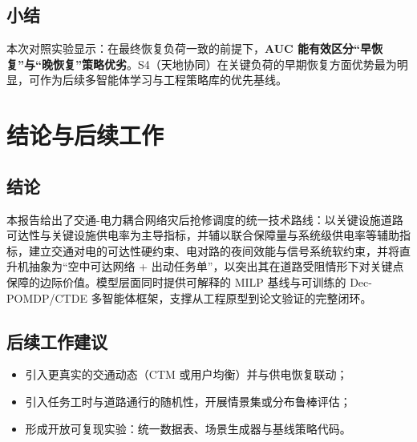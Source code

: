 \documentclass[UTF8,zihao=-4,a4paper,fontset=fandol]{ctexrep}
\begin{document}
\section{小结}
本次对照实验显示：在最终恢复负荷一致的前提下，\textbf{AUC 能有效区分“早恢复”与“晚恢复”策略优劣}。S4（天地协同）在关键负荷的早期恢复方面优势最为明显，可作为后续多智能体学习与工程策略库的优先基线。

\chapter{结论与后续工作}\label{ch:conclusion}
\section{结论}
本报告给出了交通-电力耦合网络灾后抢修调度的统一技术路线：以关键设施道路可达性与关键设施供电率为主导指标，并辅以联合保障量与系统级供电率等辅助指标，建立交通对电的可达性硬约束、电对路的夜间效能与信号系统软约束，并将直升机抽象为“空中可达网络 + 出动任务单”，以突出其在道路受阻情形下对关键点保障的边际价值。模型层面同时提供可解释的 MILP 基线与可训练的 Dec-POMDP/CTDE 多智能体框架，支撑从工程原型到论文验证的完整闭环。

\section{后续工作建议}
\begin{itemize}[leftmargin=2em]
  \item 引入更真实的交通动态（CTM 或用户均衡）并与供电恢复联动；
  \item 引入任务工时与道路通行的随机性，开展情景集或分布鲁棒评估；
  \item 形成开放可复现实验：统一数据表、场景生成器与基线策略代码。
\end{itemize}
\end{document}
